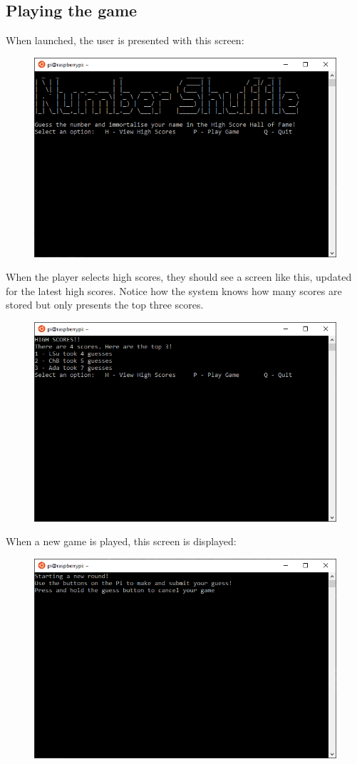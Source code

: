 \subsection{Playing the game}
When launched, the user is presented with this screen:
\begin{figure}[H]
\centering
\includegraphics[width=0.7\columnwidth]{Figures/NS_main}
\end{figure}


When the player selects high scores, they should see a screen like this, updated for the latest high scores. Notice how the system knows how many scores are stored but only presents the top three scores.

\begin{figure}[H]
\centering
\includegraphics[width=0.7\columnwidth]{Figures/NS_highscores.PNG}
\end{figure}

When a new game is played, this screen is displayed:
\begin{figure}[H]
\centering
\includegraphics[width=0.7\columnwidth]{Figures/NS_gameplay.PNG}
\end{figure}

